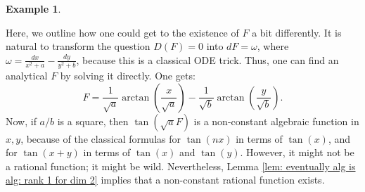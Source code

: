 \documentclass{amsart}
\newcommand{\op}{\operatorname}
\theoremstyle{definition}
\newtheorem{example}[thm]{Example}
\begin{document}
\begin{example}
\begin{enumerate}
    Here, we outline how one could get to the existence of $F$ a bit differently. It is natural to transform the question $D(F)=0$ into $dF=\omega$, where $\omega=\frac{dx}{x^2+a}-\frac{dy}{y^2+b}$, because this is a classical ODE trick. Thus, one can find an analytical $F$ by solving it directly. One gets:
    \[
    F=\frac{1}{\sqrt{a}}\op{arctan}(\frac{x}{\sqrt{a}})-\frac{1}{\sqrt{b}}\op{arctan}(\frac{y}{\sqrt{b}}).
    \]
    Now, if $a/b$ is a square, then $\op{tan}(\sqrt{a}F)$ is a non-constant algebraic function in $x,y$, because of the classical formulas for $\op{tan}(nx)$ in terms of $\op{tan}(x)$, and for $\op{tan}(x+y)$ in terms of $\op{tan}(x)$ and $\op{tan}(y)$. However, it might not be a rational function; it might be wild. Nevertheless, Lemma \ref{lem: eventually alg is alg: rank 1 for dim 2} implies that a non-constant rational function exists. 
\end{enumerate}
\end{example}




% 

\end{document}
